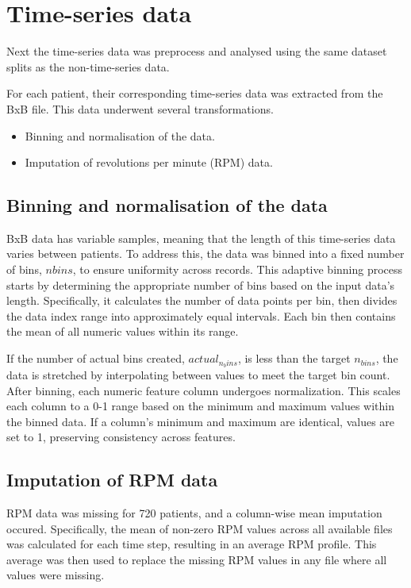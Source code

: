 \documentclass{article}
\begin{document}
\section{Time-series data}

Next the time-series data was preprocess and analysed using the same dataset splits as the non-time-series data.

For each patient, their corresponding time-series data was extracted from the BxB file. This data underwent several transformations.

\begin{itemize}
    \item Binning and normalisation of the data.
    \item Imputation of revolutions per minute (RPM) data.
\end{itemize}

\subsection{Binning and normalisation of the data}

BxB data has variable samples, meaning that the length of this time-series data varies between patients. To address this, the data was binned into a fixed number of bins, $nbins$, to ensure uniformity across records. This adaptive binning process starts by determining the appropriate number of bins based on the input data's length. Specifically, it calculates the number of data points per bin, then divides the data index range into approximately equal intervals. Each bin then contains the mean of all numeric values within its range.

If the number of actual bins created, $actual_{n_bins}$, is less than the target $n_{bins}$, the data is stretched by interpolating between values to meet the target bin count. After binning, each numeric feature column undergoes normalization. This scales each column to a 0-1 range based on the minimum and maximum values within the binned data. If a column's minimum and maximum are identical, values are set to 1, preserving consistency across features.

\subsection{Imputation of RPM data}

RPM data was missing for 720 patients, and a column-wise mean imputation occured. Specifically, the mean of non-zero RPM values across all available files was calculated for each time step, resulting in an average RPM profile. This average was then used to replace the missing RPM values in any file where all values were missing.
\end{document}

